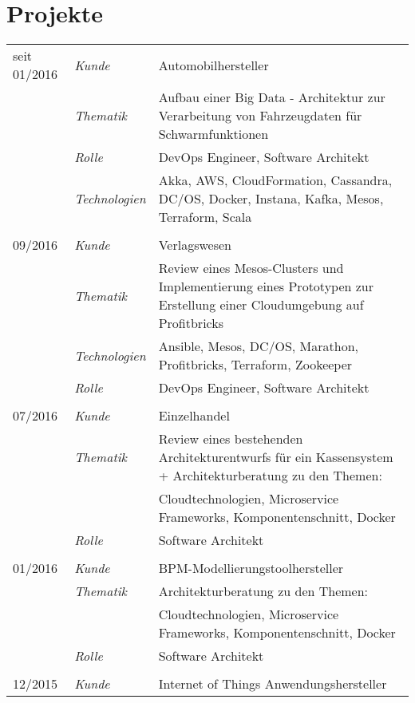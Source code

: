 \section*{Projekte}
\renewcommand{\arraystretch}{1.3}
\begin{longtable}{@{}>{}p{4cm}>{\itshape}p{2cm}>{}p{9cm}}
seit 01/2016        & Kunde 	    & Automobilhersteller\\
\nopagebreak		& Thematik	    & Aufbau einer Big Data - Architektur zur Verarbeitung von Fahrzeugdaten für Schwarmfunktionen\\
\nopagebreak		& Rolle 	    & DevOps Engineer, Software Architekt\\
\nopagebreak		& Technologien	& Akka, AWS, CloudFormation, Cassandra, DC/OS, Docker, Instana, Kafka, Mesos, Terraform, Scala\\
\\
09/2016             & Kunde 	    & Verlagswesen\\
\nopagebreak		& Thematik	    & Review eines Mesos-Clusters und Implementierung eines Prototypen zur Erstellung einer Cloudumgebung auf Profitbricks\\
\nopagebreak		& Technologien	& Ansible, Mesos, DC/OS, Marathon, Profitbricks, Terraform, Zookeeper\\
\nopagebreak		& Rolle 	    & DevOps Engineer, Software Architekt\\
\\
07/2016             & Kunde 	    & Einzelhandel\\
\nopagebreak		& Thematik	    & Review eines bestehenden Architekturentwurfs für ein Kassensystem + Architekturberatung zu den Themen:\\
\nopagebreak		&           	& Cloudtechnologien, Microservice Frameworks, Komponentenschnitt, Docker\\
\nopagebreak		& Rolle 	    & Software Architekt\\
\\
01/2016             & Kunde 	    & BPM-Modellierungstoolhersteller\\
\nopagebreak		& Thematik	    & Architekturberatung zu den Themen:\\
\nopagebreak		&           	& Cloudtechnologien, Microservice Frameworks, Komponentenschnitt, Docker\\
\nopagebreak		& Rolle 	    & Software Architekt\\
\\
12/2015             & Kunde 	    & Internet of Things Anwendungshersteller\\

\end{longtable}
